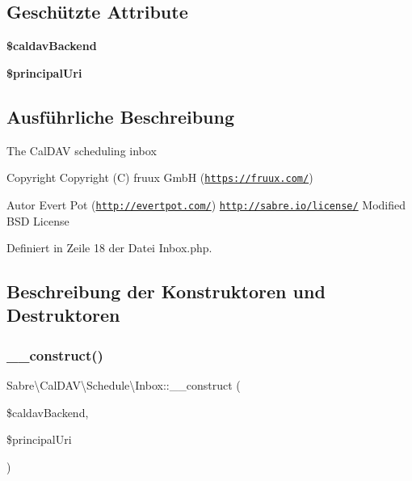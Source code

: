 \subsection*{Geschützte Attribute}
\begin{DoxyCompactItemize}
\item 
\mbox{\label{class_sabre_1_1_cal_d_a_v_1_1_schedule_1_1_inbox_a48169fcd0464ab0c119e3e6ea8e1759b}} 
{\bfseries \$caldav\+Backend}
\item 
\mbox{\label{class_sabre_1_1_cal_d_a_v_1_1_schedule_1_1_inbox_aab1bdbc43656cadea1aefdacdb78d501}} 
{\bfseries \$principal\+Uri}
\end{DoxyCompactItemize}


\subsection{Ausführliche Beschreibung}
The Cal\+D\+AV scheduling inbox

\begin{DoxyCopyright}{Copyright}
Copyright (C) fruux GmbH (\href{https://fruux.com/}{\tt https\+://fruux.\+com/}) 
\end{DoxyCopyright}
\begin{DoxyAuthor}{Autor}
Evert Pot (\href{http://evertpot.com/}{\tt http\+://evertpot.\+com/})  \href{http://sabre.io/license/}{\tt http\+://sabre.\+io/license/} Modified B\+SD License 
\end{DoxyAuthor}


Definiert in Zeile 18 der Datei Inbox.\+php.



\subsection{Beschreibung der Konstruktoren und Destruktoren}
\mbox{\label{class_sabre_1_1_cal_d_a_v_1_1_schedule_1_1_inbox_a904643dd961e3b98cf2d3b60ef7fb626}} 
\subsubsection{\texorpdfstring{\+\_\+\+\_\+construct()}{\_\_construct()}}
{\footnotesize\ttfamily Sabre\textbackslash{}\+Cal\+D\+A\+V\textbackslash{}\+Schedule\textbackslash{}\+Inbox\+::\+\_\+\+\_\+construct (\begin{DoxyParamCaption}\item[{\mbox{\hyperlink{interface_sabre_1_1_cal_d_a_v_1_1_backend_1_1_scheduling_support}{Backend\textbackslash{}\+Scheduling\+Support}}}]{\$caldav\+Backend,  }\item[{}]{\$principal\+Uri }\end{DoxyParamCaption})}


